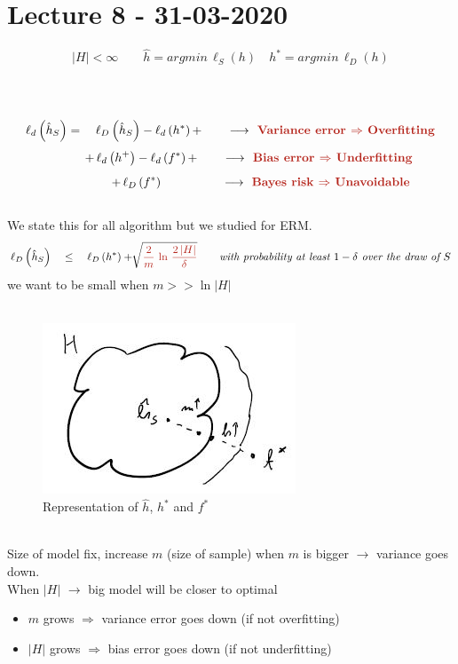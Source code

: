 \documentclass[../main.tex]{subfiles}
\begin{document}
\chapter{Lecture 8 - 31-03-2020}

$$
|H| < \infty \qquad \hat{h} = argmin \, \hat{\ell}_S \left(h\right) \quad h^* = argmin \, \ell_D\left(h\right)
$$

\\\\
$$
\ell_d\left(\hat{h}_S\right) = \quad \ell_D\left(\hat{h}_S\right) - \ell_d\left(h^*\right) + \qquad \longrightarrow \red{\textbf{ Variance error $\Rightarrow$ Overfitting}}
$$
$$
\qquad \quad +\,  \ell_d\left(h^+\right) - \ell_d\left(f^*\right) + \qquad \longrightarrow \red{\textbf{ Bias error $\Rightarrow$ Underfitting}}
$$
$$ \qquad \qquad \quad 
+ \, \ell_D\left(f^*\right)\qquad \qquad \quad  \longrightarrow \red{\textbf{ Bayes risk $\Rightarrow$ Unavoidable}} 
$$\\
We state this 
for all algorithm but we studied for ERM.
\\
$$
\ell_D\left(\hat{h}_S\right) \quad \leq \quad \ell_D \left(h^* \right) + \sqrt[]{ \red{\frac{2}{m} \, \ln \, \frac{2\, |H|}{\delta}}} \qquad \textit{with probability at least $1-\delta$ over the draw of $S$}
$$
we want  to be small when $m>> \ln|H|$
\\\\
\begin{figure}[h]
    \centering
    \includegraphics[width=0.5\linewidth]{../img/lez8-img1.JPG}
    \caption{Representation of $\hat{h}$, $h^*$ and $f^*$ }
\end{figure}\\
Size of model fix, increase $m$ (size of sample) when $m$ is bigger $\longrightarrow$ variance goes down.\\
When $|H|$ $\longrightarrow$ big model will be closer to optimal\\
\begin{itemize}
\item $m$ grows $\Rightarrow$ variance error goes down \qquad (if not overfitting)
\item $|H|$ grows $\Rightarrow$ bias error goes down \qquad (if not underfitting)
\end{itemize}
\end{document}

